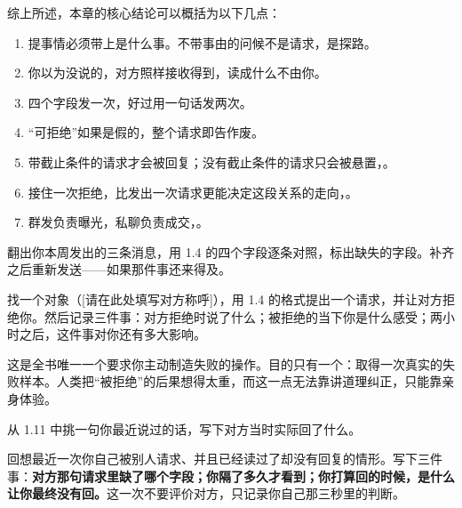 




综上所述，本章的核心结论可以概括为以下几点：

\begin{enumerate}[label=\bfseries\arabic*., leftmargin=2.4em, labelsep=0.7em,
                  itemsep=0.45em, topsep=0.2em, parsep=0.2em]
\item 提事情必须带上是什么事。不带事由的问候不是请求，是探路。
\item 你以为没说的，对方照样接收得到，读成什么不由你。
\item 四个字段发一次，好过用一句话发两次。
\item “可拒绝”如果是假的，整个请求即告作废。
\item 带截止条件的请求才会被回复；没有截止条件的请求只会被悬置，。
\item 接住一次拒绝，比发出一次请求更能决定这段关系的走向，。
\item 群发负责曝光，私聊负责成交，。
\end{enumerate}

\begin{exercisessec}
\item 翻出你本周发出的三条消息，用 1.4 的四个字段逐条对照，标出缺失的字段。补齐之后重新发送——如果那件事还来得及。

\item 找一个对象（[请在此处填写对方称呼]），用 1.4 的格式提出一个请求，并让对方拒绝你。然后记录三件事：对方拒绝时说了什么；被拒绝的当下你是什么感受；两小时之后，这件事对你还有多大影响。

\begin{mdquote}
这是全书唯一一个要求你主动制造失败的操作。目的只有一个：取得一次真实的失败样本。人类把“被拒绝”的后果想得太重，而这一点无法靠讲道理纠正，只能靠亲身体验。
\end{mdquote}

\item 从 1.11 中挑一句你最近说过的话，写下对方当时实际回了什么。

\item 回想最近一次你自己被别人请求、并且已经读过了却没有回复的情形。写下三件事：\textbf{对方那句请求里缺了哪个字段；你隔了多久才看到；你打算回的时候，是什么让你最终没有回。}这一次不要评价对方，只记录你自己那三秒里的判断。
\end{exercisessec}

